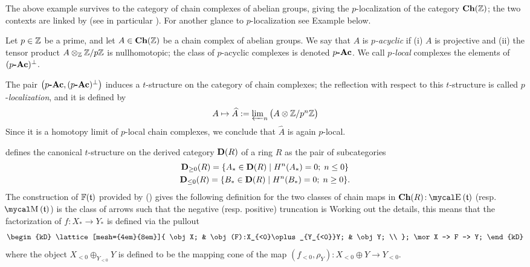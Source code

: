 The above example survives to the category of chain complexes of abelian groups, giving the $p$\hyp{}localization of the category $\textbf{Ch}(\mathbb{Z})$; the two contexts are linked by \cite[\S\textbf{2}]{bousfield1979localization} (see in particular \cite[\textbf{2.4}, \textbf{2.5}]{bousfield1979localization}). For another glance to $p$\hyp{}localization see Example  below.
\begin{example}
Let $p \in \mathbb{Z}$ be a prime, and let $A\in\textbf{Ch}(\mathbb{Z})$ be a chain complex of abelian groups. We say that $A$ is \emph{$p$\hyp{}acyclic} if (i) $A$ is projective and (ii) the tensor product $A \otimes_{\mathbb{Z}} \mathbb{Z} /p\mathbb{Z}$ is nullhomotopic; the class of $p$\hyp{}acyclic complexes is denoted $p\textbf{-Ac}$. We call \emph{$p$\hyp{}local} complexes the elements of $(p\textbf{-Ac})^\perp$.

The pair $\big(p\textbf{-Ac}, (p\textbf{-Ac})^\perp\big)$ induces a $t$\hyp{}structure on the category of chain complexes; the reflection with respect to this $t$\hyp{}structure is called $p$\hyp{}\emph{localization}, and it is defined by
\[\textstyle 
A\mapsto \widehat{A}:= \varprojlim_n \big(A\otimes \mathbb{Z}/p^n\mathbb{Z}\big)
\]
Since it is a homotopy limit of $p$\hyp{}local chain complexes, we conclude that $\widehat{A}$ is again $p$\hyp{}local.
\end{example}
\begin{example}
 defines the canonical $t$\hyp{}structure on the derived category $\textbf{D}(R)$ of a ring $R$ as the pair of subcategories
\begin{gather*}
\textbf{D}_{\ge 0}(R) = \{  A_* \in \textbf{D}(R) \mid H^n(A_*)=0;\; n\le 0 \}\\
\textbf{D}_{\le 0}(R) = \{ B_* \in \textbf{D}(R) \mid H^n(B_*)=0;\; n\ge 0 \}.
\end{gather*}
The construction of $\mathbb{F}(\mathfrak{t})$ provided by () gives the following definition for the two classes of chain maps in $\textbf{Ch}(R)$: $\EE(\tee)$ (resp. $\MM(\tee)$) is the class of arrows such that the negative (resp. positive) truncation is Working out the details, this means that the factorization of $f\colon X_*\to Y_*$ is defined via the pullout
\[
\begin{kD}
\lattice[mesh={4em}{8em}]{
	\obj X; & \obj (F):X_{<0}\oplus_{Y_{<0}}Y; & \obj Y; \\
};
\mor X -> F -> Y;
\end{kD}
\]
where the object $X_{<0}\oplus_{Y_{<0}}Y$ is defined to be the mapping cone of the map $(f_{<0}, \rho_Y)\colon X_{<0}\oplus Y\to Y_{<0}$.
\end{example}
